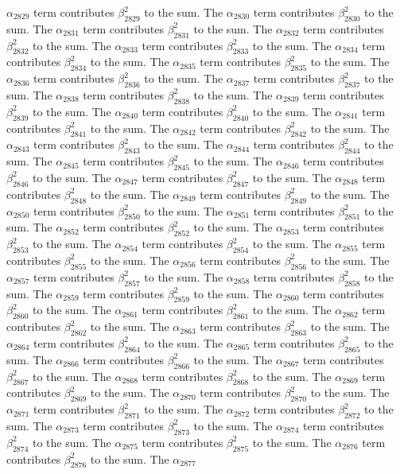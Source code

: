 \begin{lemma}
$\alpha_{2829}$ term contributes $\beta_{2829}^{2}$ to the sum. The $\alpha_{2830}$ term contributes $\beta_{2830}^{2}$ to the sum. The $\alpha_{2831}$ term contributes $\beta_{2831}^{2}$ to the sum. The $\alpha_{2832}$ term contributes $\beta_{2832}^{2}$ to the sum. The $\alpha_{2833}$ term contributes $\beta_{2833}^{2}$ to the sum. The $\alpha_{2834}$ term contributes $\beta_{2834}^{2}$ to the sum. The $\alpha_{2835}$ term contributes $\beta_{2835}^{2}$ to the sum. The $\alpha_{2836}$ term contributes $\beta_{2836}^{2}$ to the sum. The $\alpha_{2837}$ term contributes $\beta_{2837}^{2}$ to the sum. The $\alpha_{2838}$ term contributes $\beta_{2838}^{2}$ to the sum. The $\alpha_{2839}$ term contributes $\beta_{2839}^{2}$ to the sum. The $\alpha_{2840}$ term contributes $\beta_{2840}^{2}$ to the sum. The $\alpha_{2841}$ term contributes $\beta_{2841}^{2}$ to the sum. The $\alpha_{2842}$ term contributes $\beta_{2842}^{2}$ to the sum. The $\alpha_{2843}$ term contributes $\beta_{2843}^{2}$ to the sum. The $\alpha_{2844}$ term contributes $\beta_{2844}^{2}$ to the sum. The $\alpha_{2845}$ term contributes $\beta_{2845}^{2}$ to the sum. The $\alpha_{2846}$ term contributes $\beta_{2846}^{2}$ to the sum. The $\alpha_{2847}$ term contributes $\beta_{2847}^{2}$ to the sum. The $\alpha_{2848}$ term contributes $\beta_{2848}^{2}$ to the sum. The $\alpha_{2849}$ term contributes $\beta_{2849}^{2}$ to the sum. The $\alpha_{2850}$ term contributes $\beta_{2850}^{2}$ to the sum. The $\alpha_{2851}$ term contributes $\beta_{2851}^{2}$ to the sum. The $\alpha_{2852}$ term contributes $\beta_{2852}^{2}$ to the sum. The $\alpha_{2853}$ term contributes $\beta_{2853}^{2}$ to the sum. The $\alpha_{2854}$ term contributes $\beta_{2854}^{2}$ to the sum. The $\alpha_{2855}$ term contributes $\beta_{2855}^{2}$ to the sum. The $\alpha_{2856}$ term contributes $\beta_{2856}^{2}$ to the sum. The $\alpha_{2857}$ term contributes $\beta_{2857}^{2}$ to the sum. The $\alpha_{2858}$ term contributes $\beta_{2858}^{2}$ to the sum. The $\alpha_{2859}$ term contributes $\beta_{2859}^{2}$ to the sum. The $\alpha_{2860}$ term contributes $\beta_{2860}^{2}$ to the sum. The $\alpha_{2861}$ term contributes $\beta_{2861}^{2}$ to the sum. The $\alpha_{2862}$ term contributes $\beta_{2862}^{2}$ to the sum. The $\alpha_{2863}$ term contributes $\beta_{2863}^{2}$ to the sum. The $\alpha_{2864}$ term contributes $\beta_{2864}^{2}$ to the sum. The $\alpha_{2865}$ term contributes $\beta_{2865}^{2}$ to the sum. The $\alpha_{2866}$ term contributes $\beta_{2866}^{2}$ to the sum. The $\alpha_{2867}$ term contributes $\beta_{2867}^{2}$ to the sum. The $\alpha_{2868}$ term contributes $\beta_{2868}^{2}$ to the sum. The $\alpha_{2869}$ term contributes $\beta_{2869}^{2}$ to the sum. The $\alpha_{2870}$ term contributes $\beta_{2870}^{2}$ to the sum. The $\alpha_{2871}$ term contributes $\beta_{2871}^{2}$ to the sum. The $\alpha_{2872}$ term contributes $\beta_{2872}^{2}$ to the sum. The $\alpha_{2873}$ term contributes $\beta_{2873}^{2}$ to the sum. The $\alpha_{2874}$ term contributes $\beta_{2874}^{2}$ to the sum. The $\alpha_{2875}$ term contributes $\beta_{2875}^{2}$ to the sum. The $\alpha_{2876}$ term contributes $\beta_{2876}^{2}$ to the sum. The $\alpha_{2877}$ 
\end{lemma}
